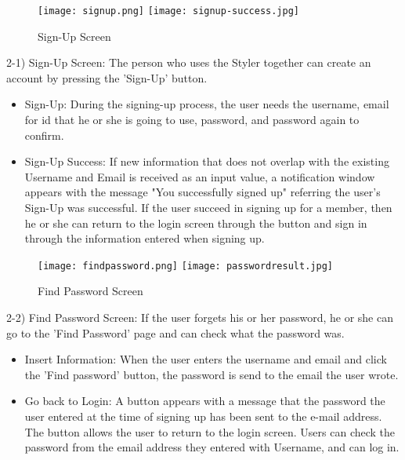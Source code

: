 \documentclass[conference]{IEEEtran}
\begin{document}
\begin{figure}[htbp]
\centerline{
\texttt{[image: signup.png]}
\texttt{[image: signup-success.jpg]}
}
\caption{Sign-Up Screen}
\label{fig}
\end{figure}
2-1) Sign-Up Screen: The person who uses the Styler together can create an account by pressing the 'Sign-Up' button.
\begin{itemize}
    \item Sign-Up: During the signing-up process, the user needs the username, email for id that he or she is going to use, password, and password again to confirm.
    \item Sign-Up Success: If new information that does not overlap with the existing Username and Email is received as an input value, a notification window appears with the message "You successfully signed up" referring the user's Sign-Up was successful. If the user succeed in signing up for a member, then he or she can return to the login screen through the button and sign in through the information entered when signing up.\\
\end{itemize}

\begin{figure}[htbp]
\centerline{
\texttt{[image: findpassword.png]}
\texttt{[image: passwordresult.jpg]}
}
\caption{Find Password Screen}
\label{fig}
\end{figure}
2-2) Find Password Screen: If the user forgets his or her password, he or she can go to the 'Find Password' page and can check what the password was. 
\begin{itemize}
    \item Insert Information: When the user enters the username and email and click the 'Find password' button, the password is send to the email the user wrote.
    \item Go back to Login: A button appears with a message that the password the user entered at the time of signing up has been sent to the e-mail address. The button allows the user to return to the login screen. Users can check the password from the email address they entered with Username, and can log in.\\
\end{itemize}
\end{document}
